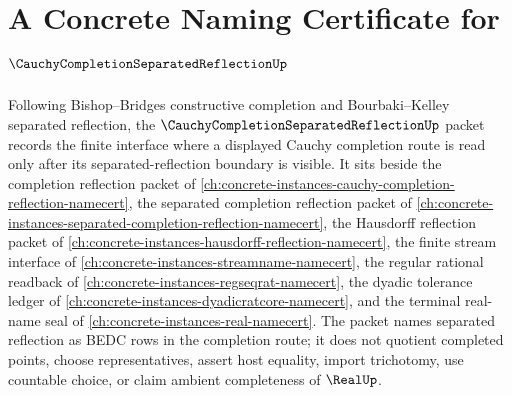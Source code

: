 \chapter{A Concrete Naming Certificate for $\CauchyCompletionSeparatedReflectionUp$}
\label{ch:concrete-instances-cauchy-completion-separated-reflection-namecert}

Following Bishop--Bridges constructive completion and Bourbaki--Kelley separated reflection, the $\CauchyCompletionSeparatedReflectionUp$ packet records the finite interface where a displayed Cauchy completion route is read only after its separated-reflection boundary is visible. It sits beside the completion reflection packet of \autoref{ch:concrete-instances-cauchy-completion-reflection-namecert}, the separated completion reflection packet of \autoref{ch:concrete-instances-separated-completion-reflection-namecert}, the Hausdorff reflection packet of \autoref{ch:concrete-instances-hausdorff-reflection-namecert}, the finite stream interface of \autoref{ch:concrete-instances-streamname-namecert}, the regular rational readback of \autoref{ch:concrete-instances-regseqrat-namecert}, the dyadic tolerance ledger of \autoref{ch:concrete-instances-dyadicratcore-namecert}, and the terminal real-name seal of \autoref{ch:concrete-instances-real-namecert}. The packet names separated reflection as BEDC rows in the completion route; it does not quotient completed points, choose representatives, assert host equality, import trichotomy, use countable choice, or claim ambient completeness of $\RealUp$.

